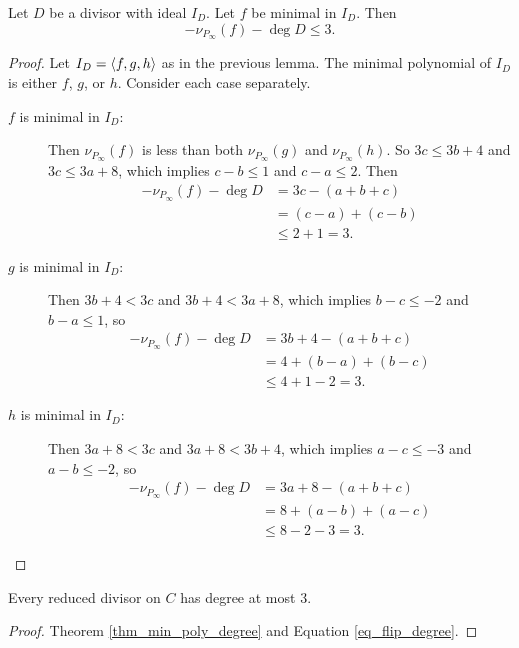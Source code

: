 \begin{theorem}
  \label{thm_min_poly_degree}
  Let $D$ be a divisor with ideal $I_D$.
  Let $f$ be minimal in $I_D$. Then
  \[ -\nu_{P_\infty}(f) - \deg D \leq 3. \]
\end{theorem}
\begin{proof}
  Let $I_D = \left\langle f, g, h \right\rangle$ as in the previous lemma.
  The minimal polynomial of $I_D$ is either $f$, $g$, or $h$.
  Consider each case separately.
  \begin{description}
    \item[$f$ is minimal in $I_D$:]
      Then $\nu_{P_\infty}(f)$ is less than both $\nu_{P_\infty}(g)$ and $\nu_{P_\infty}(h)$.
      So $3c \leq 3b + 4$ and $3c \leq 3a + 8$, which implies
      $c - b \leq 1$ and $c - a \leq 2$. Then
      \begin{align*}
        -\nu_{P_\infty}(f) - \deg D
          &= 3c - (a + b + c) \\
          &= (c - a) + (c - b) \\
          &\leq 2 + 1 = 3.
      \end{align*}
      
    \item[$g$ is minimal in $I_D$:]
      Then $3b + 4 < 3c$ and $3b + 4 < 3a + 8$,
      which implies $b - c \leq -2$ and $b - a \leq 1$, so
      \begin{align*}
        -\nu_{P_\infty}(f) - \deg D
          &= 3b + 4 - (a + b + c) \\
          &= 4 + (b - a) + (b - c) \\
          &\leq 4 + 1 - 2 = 3.
      \end{align*}

    \item[$h$ is minimal in $I_D$:]
      Then $3a + 8 < 3c$ and $3a + 8 < 3b + 4$,
      which implies $a - c \leq -3$ and $a - b \leq -2$, so
      \begin{align*}
        -\nu_{P_\infty}(f) - \deg D
          &= 3a + 8 - (a + b + c) \\
          &= 8 + (a - b) + (a - c) \\
          &\leq 8 - 2 - 3 = 3.
      \end{align*}
  \end{description}
\end{proof}

\begin{theorem}
  Every reduced divisor on $C$ has degree at most 3.
\end{theorem}
\begin{proof}
  Theorem \ref{thm_min_poly_degree} and Equation \ref{eq_flip_degree}.
\end{proof}

